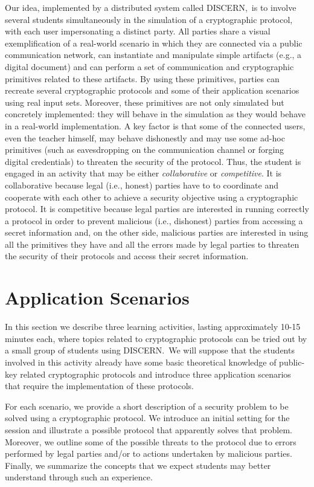 \documentclass[conference]{IEEEtran}
\def\disgrace{DISCERN}
\begin{document}
Our idea, implemented by a distributed system called \disgrace,\ is to
involve several students simultaneously in the simulation of a
cryptographic protocol, with each user impersonating a distinct party.
All parties share a visual exemplification of a real-world scenario in
which they are connected via a public communication network, can
instantiate and manipulate simple artifacts (e.g., a digital document)
and can perform a set of communication and cryptographic primitives
related to these artifacts. By using these primitives, parties can
recreate several cryptographic protocols and some of their application
scenarios using real input sets. Moreover, these primitives are not
only simulated but concretely implemented: they will behave in the
simulation as they would behave in a real-world implementation. 
A key factor is that some of the connected users, even the teacher himself, may behave dishonestly and
may use some ad-hoc primitives (such as eavesdropping on the
communication channel or forging digital credentials) to threaten the
security of the protocol. Thus, the student is engaged in an activity
that may be either {\em collaborative} or {\em competitive}. It is
collaborative because legal (i.e., honest) parties have to to
coordinate and cooperate with each other to achieve a security objective using a cryptographic
protocol. It is competitive because legal parties are interested in
running correctly a protocol in order to prevent malicious (i.e.,
dishonest) parties from accessing a secret information and, on the
other side, malicious parties are interested in using all the
primitives they have and all the errors made by legal parties
to threaten the security of their protocols and access their secret information.

\section{Application Scenarios}
\label{sec:application}
In this section we describe three learning activities, lasting
approximately 10-15 minutes each, where topics related to
cryptographic protocols can be tried out by a small group of students
using \disgrace.\ We will suppose that the
students involved in this activity already have some basic theoretical
knowledge of public-key related cryptographic protocols and introduce
three application scenarios that require the implementation of these
protocols.

For each scenario, we provide a short description of a security
problem to be solved using a cryptographic protocol. We introduce an
initial setting for the session and illustrate a possible protocol
that apparently solves that problem. Moreover, we outline some of the
possible threats to the protocol due to errors performed by legal
parties and/or to actions undertaken by malicious parties. Finally, we
summarize the concepts that we expect students may better understand
through such an experience.
\end{document}
